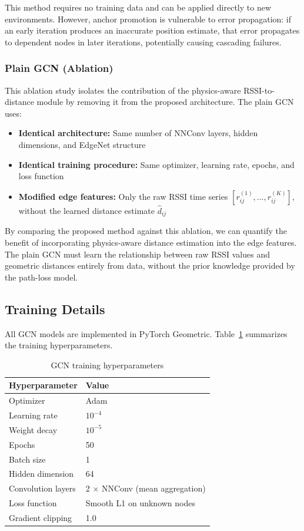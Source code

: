 \documentclass[master,final,11pt]{iscs-thesis}
\begin{document}
This method requires no training data and can be applied directly to new environments.
However, anchor promotion is vulnerable to error propagation: if an early iteration produces an inaccurate position estimate, that error propagates to dependent nodes in later iterations, potentially causing cascading failures.

\subsubsection{Plain GCN (Ablation)}

This ablation study isolates the contribution of the physics-aware RSSI-to-distance module by removing it from the proposed architecture.
The plain GCN uses:
\begin{itemize}
    \item \textbf{Identical architecture:} Same number of NNConv layers, hidden dimensions, and EdgeNet structure
    \item \textbf{Identical training procedure:} Same optimizer, learning rate, epochs, and loss function
    \item \textbf{Modified edge features:} Only the raw RSSI time series $[r_{ij}^{(1)}, \ldots, r_{ij}^{(K)}]$, without the learned distance estimate $\hat{d}_{ij}$
\end{itemize}

By comparing the proposed method against this ablation, we can quantify the benefit of incorporating physics-aware distance estimation into the edge features.
The plain GCN must learn the relationship between raw RSSI values and geometric distances entirely from data, without the prior knowledge provided by the path-loss model.

\subsection{Training Details}

All GCN models are implemented in PyTorch Geometric.
Table~\ref{tab:gcn_hyperparams} summarizes the training hyperparameters.

\begin{table}[htbp]
\centering
\caption{GCN training hyperparameters}
\label{tab:gcn_hyperparams}
\begin{tabular}{@{}ll@{}}
\toprule
\textbf{Hyperparameter} & \textbf{Value} \\
\midrule
Optimizer & Adam \\
Learning rate & $10^{-4}$ \\
Weight decay & $10^{-5}$ \\
Epochs & 50 \\
Batch size & 1 \\
Hidden dimension & 64 \\
Convolution layers & 2 $\times$ NNConv (mean aggregation) \\
Loss function & Smooth L1 on unknown nodes \\
Gradient clipping & 1.0 \\
\bottomrule
\end{tabular}
\end{table}
\end{document}
